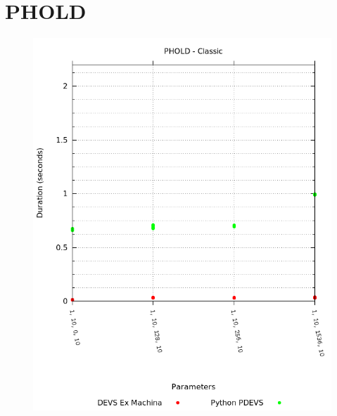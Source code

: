 \documentclass[8pt,a4paper]{report}
\begin{document}
\pagebreak

\section{PHOLD}
\begin{figure}
\centering
\begin{minipage}{.5\textwidth}
  \centering
  \hspace*{-1.5in}
  \includegraphics[width=1.6\linewidth]{phold_classic.png}
\end{minipage}%
\begin{minipage}{.5\textwidth}
  \centering

\end{minipage}
\end{figure}
\end{document}
